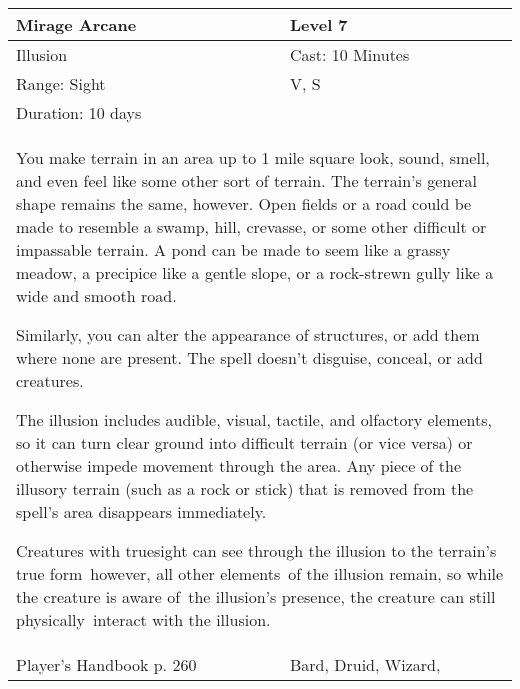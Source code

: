 \documentclass[11pt]{report}
\begin{document}
\begin{table}[H]
	\begin{tabular}{||p{6cm}|p{6cm}||}
		\hline\hline
		\bf{Mirage Arcane} & Level 7\\ \hline
		Illusion & Cast: 10 Minutes\\ \hline
		Range: Sight & V, S\\ \hline
		Duration: 10 days & \\ \hline
		\multicolumn{2}{||p{12cm}||}{You make terrain in an area up to 1 mile square look, sound, smell, and even feel like some other sort of terrain.
The terrain’s general shape remains the same, however. Open fields or a road could be made to resemble a swamp, hill, crevasse, or some other difficult or impassable terrain. A pond can be made to seem like a grassy meadow, a precipice like a gentle slope, or a rock-strewn gully like a wide and smooth road.

Similarly, you can alter the appearance of structures, or add them where none are present. The spell doesn’t disguise, conceal, or add creatures.

The illusion includes audible, visual, tactile, and olfactory elements, so it can turn clear ground into difficult terrain (or vice versa) or otherwise impede movement through the area. Any piece of the illusory terrain (such as a rock or stick) that is removed from the spell’s area disappears immediately.

Creatures with truesight can see through the illusion to the terrain’s true form however, all other elements of the illusion remain, so while the creature is aware of the illusion’s presence, the creature can still physically interact with the illusion.}\\ \hline
Player's Handbook p. 260 & Bard, Druid, Wizard, \\ \hline\hline
	\end{tabular}
\end{table}
\end{document}

